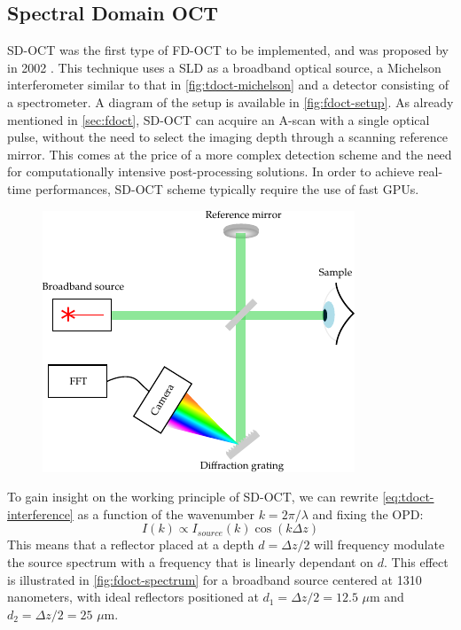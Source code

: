 \subsection{Spectral Domain OCT}
\ac{SD-OCT} was the first type of \ac{FD-OCT} to be implemented, and was proposed by \citeauthor{Wojtkowski2002} in 2002 \cite{Wojtkowski2002}. This technique uses a \ac{SLD} as a broadband optical source, a Michelson interferometer similar to that in \autoref{fig:tdoct-michelson} and a detector consisting of a spectrometer. A diagram of the setup is available in \autoref{fig:fdoct-setup}. As already mentioned in \autoref{sec:fdoct}, \ac{SD-OCT} can acquire an A-scan with a single optical pulse, without the need to select the imaging depth through a scanning reference mirror. This comes at the price of a more complex detection scheme and the need for computationally intensive post-processing solutions. In order to achieve real-time performances, \ac{SD-OCT} scheme typically require the use of fast \acp{GPU}. 

\begin{figure}[hbt]
	\myfloatalign
	\includegraphics[width=0.75\linewidth]{gfx/ch2/fdoct-setup}
	\caption{}\label{fig:fdoct-setup}
\end{figure}


To gain insight on the working principle of \ac{SD-OCT}, we can rewrite \autoref{eq:tdoct-interference} as a function of the wavenumber $k = 2\pi/\lambda$ and fixing the \ac{OPD}:
\begin{equation}
	I(k) \propto I_{source}(k)\cos\left(k \Delta z\right)
\end{equation}
This means that a reflector placed at a depth $d = \Delta z/2$ will frequency modulate the source spectrum with a frequency that is linearly dependant on $d$. This effect is illustrated in \autoref{fig:fdoct-spectrum} for a broadband source centered at 1310 nanometers, with ideal reflectors positioned at $d_1 = \Delta z/2 = 12.5$ $\mu$m and $d_2 = \Delta z/2 = 25$ $\mu$m. 

